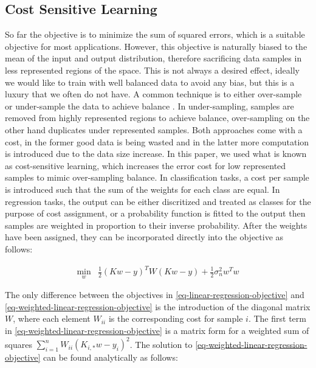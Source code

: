 \documentclass[useAMS,usenatbib,fleqn]{mn2e}
\begin{document}
\subsection{Cost Sensitive Learning}

So far the objective is to minimize the sum of squared errors, which is a suitable objective for most applications. However, this objective is naturally biased to the mean of the input and output distribution, therefore sacrificing data samples in less represented regions of the space. This is not always a desired effect, ideally we would like to train with well balanced data to avoid any bias, but this is a luxury that we often do not have. A common technique is to either over-sample or under-sample the data to achieve balance \cite{}. In under-sampling, samples are removed from highly represented regions to achieve balance, over-sampling on the other hand duplicates under represented samples. Both approaches come with a cost, in the former good data is being wasted and in the latter more computation is introduced due to the data size increase. In this paper, we used what is known as cost-sensitive learning, which increases the error cost for low represented samples to mimic over-sampling balance. In classification tasks, a cost per sample is introduced such that the sum of the weights for each class are equal. In regression tasks, the output can be either discritized and treated as classes for the purpose of cost assignment, or a probability function is fitted to the output then samples are weighted in proportion to their inverse probability. After the weights have been assigned, they can be incorporated directly into the objective as follows:

\begin{equation}
\label{eq-weighted-linear-regression-objective}
\begin{array}{lcl}
\underset{w}{\text{min}} &\frac{1}{2}\left ( Kw-y \right )^{T} W\left( Kw-y \right )+\frac{1}{2}\sigma_{n}^{2}w^{T}w
\end{array}
\end{equation}

The only difference between the objectives in \eqref{eq-linear-regression-objective} and \eqref{eq-weighted-linear-regression-objective} is the introduction of the diagonal matrix $W$, where each element $W_{ii}$ is the corresponding cost for sample $i$. The first term in \eqref{eq-weighted-linear-regression-objective} is a matrix form for a weighted sum of squares $\sum_{i=1}^{n}W_{ii}\left(K_{i,*}w-y_{i}\right)^{2}$. The solution to \eqref{eq-weighted-linear-regression-objective} can be found analytically as follows:
\end{document}
